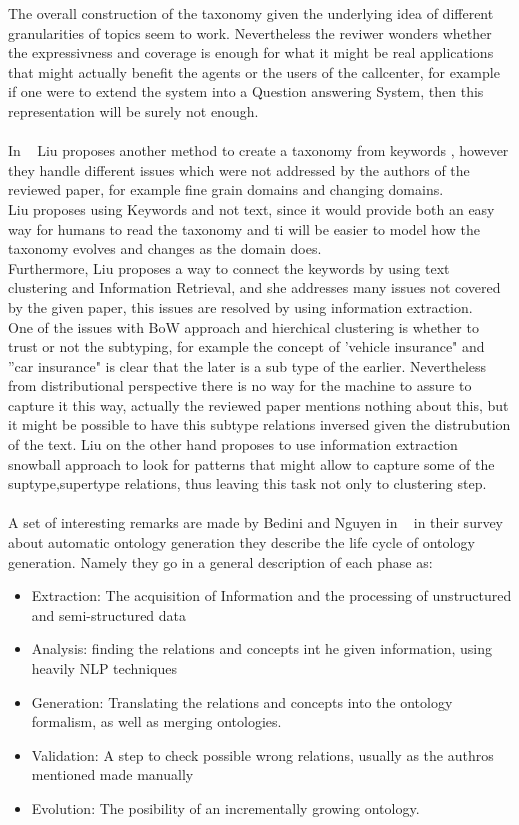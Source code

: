 \documentclass[4pt,a4paper,twocolumn]{article}
\begin{document}
The overall construction of the taxonomy given the underlying idea of different granularities of topics seem to work. Nevertheless the reviwer wonders whether the expressivness and coverage is enough for what it might be real applications that might actually benefit the agents or the users of the callcenter, for example if one were to extend the system into a Question answering System, then this representation will be surely not enough.\\
\\
In ~\cite{DBLP:conf/kdd/LiuSLW12} Liu proposes another method to create a taxonomy from keywords , however they handle different issues which were not addressed by the authors of the reviewed paper, for example fine grain domains and changing domains.\\
Liu proposes using Keywords and not text, since it would provide both an easy way for humans to read the taxonomy and ti will be easier to model how the taxonomy evolves and changes as the domain does.\\
Furthermore, Liu proposes a way to connect the keywords by using text clustering and Information Retrieval, and she addresses many issues not covered by the given paper, this issues are resolved by using information extraction.\\
One of the issues with BoW approach and hierchical clustering is whether to trust or not the subtyping, for example the concept of 'vehicle insurance" and ''car insurance"  is clear that the later is a sub type of the earlier. Nevertheless from distributional perspective there is no way for the machine to assure to capture it this way, actually the reviewed paper mentions nothing about this, but it might be possible to have this subtype relations inversed given the distrubution of the text. Liu on the other hand proposes to use information extraction snowball approach to look for patterns that might allow to capture some of the suptype,supertype relations, thus leaving this task not only to clustering step.\\
\\
A set of interesting remarks are made by  Bedini and Nguyen in ~\cite{artofontology} in their survey about automatic ontology generation they describe the life cycle of ontology generation. Namely they go in a general description of each phase as:
\begin{itemize}
	\item Extraction: The acquisition of Information and the processing of unstructured and semi-structured data
	\item Analysis: finding the relations and concepts int he given information, using heavily NLP techniques
	\item Generation: Translating the relations and concepts into the ontology formalism, as well as merging ontologies.
	\item Validation: A step to check possible wrong relations, usually as the authros mentioned made manually
	\item Evolution: The posibility of an incrementally growing ontology.
\end{itemize}
\end{document}
